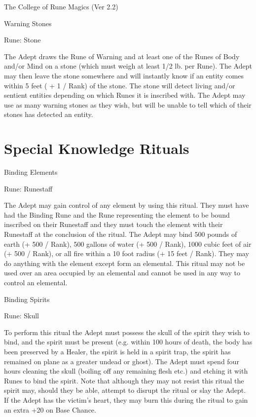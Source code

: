 \begin{Chapter}{The College of Rune Magics (Ver 2.2)}
\begin{spell}[S-17]{Warning Stones }

Rune: Stone 
\begin{effects}
The Adept draws the Rune of Warning and at least one of the Runes of
Body and/or Mind on a stone (which must weigh at least 1/2 lb. per
Rune).  The Adept may then leave the stone somewhere and will
instantly know if an entity comes within 5 feet ( + 1 / Rank) of the
stone. The stone will detect living and/or sentient entities depending
on which Runes it is inscribed with.  The Adept may use as many
warning stones as they wish, but will be unable to tell which of their
stones has detected an entity.
\end{effects}
\end{spell}

\section{Special Knowledge Rituals}

\begin{ritual}[R-1]{Binding Elements }

Rune: Runestaff 
\begin{effects}
The Adept may gain control of any element by using this ritual.  They
must have had the Binding Rune and the Rune representing the element
to be bound inscribed on their Runestaff and they must touch the
element with their Runestaff at the conclusion of the ritual.  The
Adept may bind 500 pounds of earth (+ 500 / Rank), 500 gallons of
water (+ 500 / Rank), 1000 cubic feet of air (+ 500 / Rank), or all
fire within a 10 foot radius (+ 15 feet / Rank).  They may do anything
with the element except form an elemental.  This ritual may not be
used over an area occupied by an elemental and cannot be used in any
way to control an elemental.
\end{effects}
\end{ritual}

\begin{ritual}[R-2]{Binding Spirits }

Rune: Skull 
\begin{effects}
To perform this ritual the Adept must possess the skull of the spirit
they wish to bind, and the spirit must be present (e.g. within 100
hours of death, the body has been preserved by a Healer, the spirit is
held in a spirit trap, the spirit has remained on plane as a greater
undead or ghost). The Adept must spend four hours cleaning the skull
(boiling off any remaining flesh etc.)  and etching it with Runes to
bind the spirit.  Note that although they may not resist this ritual
the spirit may, should they be able, attempt to disrupt the ritual or
slay the Adept.  If the Adept has the victim’s heart, they may burn
this during the ritual to gain an extra +20 on Base Chance.


\end{effects}
\end{ritual}
\end{Chapter}
